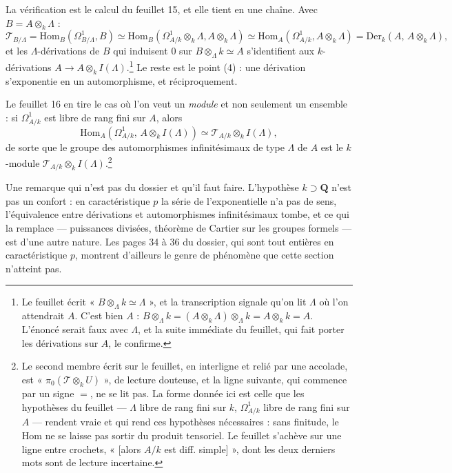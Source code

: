 \documentclass[11pt,a4paper]{article}
\begin{document}
La vérification est le calcul du feuillet 15, et elle tient en une chaîne. Avec
$B = A \otimes_{k} \Lambda$ :
\[
  \mathcal{T}_{B/\Lambda}
  = \mathrm{Hom}_{B}(\Omega^{1}_{B/\Lambda}, B)
  \simeq \mathrm{Hom}_{B}(\Omega^{1}_{A/k} \otimes_{k} \Lambda,
    A \otimes_{k} \Lambda)
  \simeq \mathrm{Hom}_{A}(\Omega^{1}_{A/k}, A \otimes_{k} \Lambda)
  = \mathrm{Der}_k(A,\, A \otimes_{k} \Lambda) ,
\]
et les $\Lambda$-dérivations de $B$ qui induisent $0$ sur $B \otimes_{\Lambda} k
\simeq A$ s'identifient aux $k$-dérivations $A \to A \otimes_{k}
I(\Lambda)$.\footnote{Le feuillet écrit « $B \otimes_{\Lambda} k \simeq
\Lambda$ », et la transcription signale qu'on lit $\Lambda$ où l'on attendrait
$A$. C'est bien $A$ : $B \otimes_\Lambda k = (A \otimes_k \Lambda)
\otimes_\Lambda k = A \otimes_k k = A$. L'énoncé serait faux avec $\Lambda$, et
la suite immédiate du feuillet, qui fait porter les dérivations sur $A$, le
confirme.} Le reste est le point (4) : une dérivation s'exponentie en un
automorphisme, et réciproquement.

Le feuillet 16 en tire le cas où l'on veut un \emph{module} et non seulement un
ensemble : si $\Omega^{1}_{A/k}$ est libre de rang fini sur $A$, alors
\[
  \mathrm{Hom}_{A}(\Omega^{1}_{A/k},\, A \otimes_{k} I(\Lambda))
  \simeq \mathcal{T}_{A/k} \otimes_{k} I(\Lambda) ,
\]
de sorte que le groupe des automorphismes infinitésimaux de type $\Lambda$ de
$A$ est le $k$-module $\mathcal{T}_{A/k} \otimes_{k}
I(\Lambda)$.\footnote{Le second membre écrit sur le feuillet, en interligne et
relié par une accolade, est « $\pi_{0}(\mathcal{T} \otimes_{k} U)$ », de lecture
douteuse, et la ligne suivante, qui commence par un signe $=$, ne se lit pas. La
forme donnée ici est celle que les hypothèses du feuillet — $\Lambda$ libre de
rang fini sur $k$, $\Omega^{1}_{A/k}$ libre de rang fini sur $A$ — rendent vraie
et qui rend ces hypothèses nécessaires : sans finitude, le $\mathrm{Hom}$ ne se
laisse pas sortir du produit tensoriel. Le feuillet s'achève sur une ligne entre
crochets, « [alors $A/k$ est diff. simple] », dont les deux derniers mots sont
de lecture incertaine.}

Une remarque qui n'est pas du dossier et qu'il faut faire. L'hypothèse
$k \supset \mathbf{Q}$ n'est pas un confort : en caractéristique $p$ la série de
l'exponentielle n'a pas de sens, l'équivalence entre dérivations et
automorphismes infinitésimaux tombe, et ce qui la remplace — puissances divisées,
théorème de Cartier sur les groupes formels — est d'une autre nature. Les pages
34 à 36 du dossier, qui sont tout entières en caractéristique $p$, montrent
d'ailleurs le genre de phénomène que cette section n'atteint pas.
\end{document}
